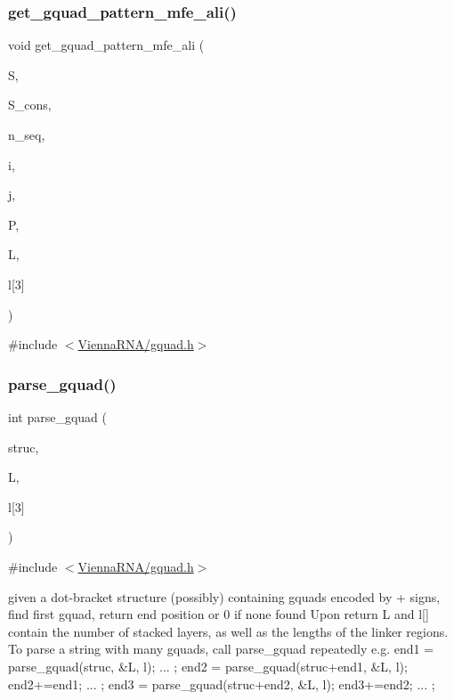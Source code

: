\subsubsection{\texorpdfstring{get\+\_\+gquad\+\_\+pattern\+\_\+mfe\+\_\+ali()}{get\_gquad\_pattern\_mfe\_ali()}}
{\footnotesize\ttfamily void get\+\_\+gquad\+\_\+pattern\+\_\+mfe\+\_\+ali (\begin{DoxyParamCaption}\item[{short $\ast$$\ast$}]{S,  }\item[{short $\ast$}]{S\+\_\+cons,  }\item[{int}]{n\+\_\+seq,  }\item[{int}]{i,  }\item[{int}]{j,  }\item[{\mbox{\hyperlink{group__energy__parameters_ga8a69ca7d787e4fd6079914f5343a1f35}{vrna\+\_\+param\+\_\+t}} $\ast$}]{P,  }\item[{int $\ast$}]{L,  }\item[{int}]{l\mbox{[}3\mbox{]} }\end{DoxyParamCaption})}



{\ttfamily \#include $<$\mbox{\hyperlink{gquad_8h}{Vienna\+R\+N\+A/gquad.\+h}}$>$}

\mbox{\label{group__gquads_gae41763215b9c64d2a7b67f0df8a28078}} 
\subsubsection{\texorpdfstring{parse\+\_\+gquad()}{parse\_gquad()}}
{\footnotesize\ttfamily int parse\+\_\+gquad (\begin{DoxyParamCaption}\item[{const char $\ast$}]{struc,  }\item[{int $\ast$}]{L,  }\item[{int}]{l\mbox{[}3\mbox{]} }\end{DoxyParamCaption})}



{\ttfamily \#include $<$\mbox{\hyperlink{gquad_8h}{Vienna\+R\+N\+A/gquad.\+h}}$>$}

given a dot-\/bracket structure (possibly) containing gquads encoded by \textquotesingle{}+\textquotesingle{} signs, find first gquad, return end position or 0 if none found Upon return L and l\mbox{[}\mbox{]} contain the number of stacked layers, as well as the lengths of the linker regions. To parse a string with many gquads, call parse\+\_\+gquad repeatedly e.\+g. end1 = parse\+\_\+gquad(struc, \&\+L, l); ... ; end2 = parse\+\_\+gquad(struc+end1, \&L, l); end2+=end1; ... ; end3 = parse\+\_\+gquad(struc+end2, \&L, l); end3+=end2; ... ; \mbox{\label{group__gquads_ga220c41e8dbcee940ac975b8ce88e55c5}} 

